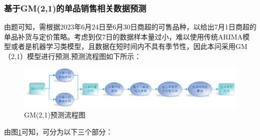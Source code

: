 \documentclass{my_paper}
\begin{document}
\subsubsection{基于GM(2,1)的单品销售相关数据预测}
由题可知，需根据2023年6月24日至6月30日商超的可售品种，以给出7月1日商超的单品补货与定价策略。考虑到仅7日的数据样本量过小，难以使用传统ARIMA模型或者是机器学习类模型，且数据在短时间内不具有季节性，因此本问采用GM（2,1）模型进行预测,预测流程图如下所示：
\begin{figure}[H]
 \centering
 \includegraphics[width=\textwidth]{GM(2,1)流程图.png} 
 \caption{GM(2,1)预测流程图} %
 \label{GM(2,1)流程图} %
\end{figure}\par
由图\ref{GM(2,1)流程图}可知，可分为以下三个部分：
\end{document}
